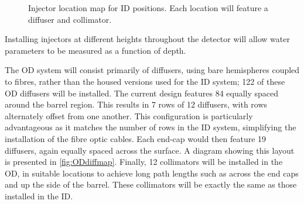 \documentclass[a4paper,11pt]{article}
\begin{document}
\begin{figure}[h]
\caption{Injector location map for ID positions. Each location will feature a diffuser and collimator.}\label{fig:IDmap}
\end{figure}
Installing injectors at different heights throughout the detector will allow water parameters to be measured as a function of depth.

The OD system will consist primarily of diffusers, using bare hemispheres coupled to fibres, rather than the housed versions used for the ID system; 122 of these OD diffusers will be installed. The current design features 84 equally spaced around the barrel region. This results in 7 rows of 12 diffusers, with rows alternately offset from one another. This configuration is particularly advantageous as it matches the number of rows in the ID system, simplifying the installation of the fibre optic cables. Each end-cap would then feature 19 diffusers, again equally spaced across the surface. A diagram showing this layout is presented in \cref{fig:ODdiffmap}. Finally, 12 collimators will be installed in the OD, in suitable locations to achieve long path lengths such as across the end caps and up the side of the barrel. These collimators will be exactly the same as those installed in the ID.
\end{document}
